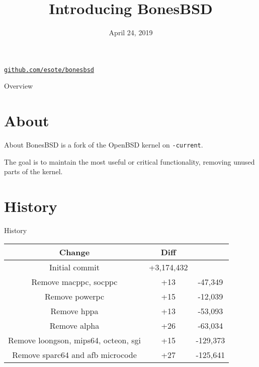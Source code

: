\documentclass{beamer}
\title[BonesBSD\hspace{1em}\texttt{\href{https://github.com/esote/bonesbsd}{github.com/esote/bonesbsd}}]{Introducing BonesBSD}
\date{April 24, 2019}
\begin{document}
\begin{frame}
	\titlepage
	\centering
	\texttt{\href{https://github.com/esote/bonesbsd}{github.com/esote/bonesbsd}}
\end{frame}

\begin{frame}{Overview}
	\tableofcontents
\end{frame}

\section{About}

\setlength{\parskip}{3em}

\begin{frame}{About}
	BonesBSD is a fork of the OpenBSD kernel on \texttt{-current}.

	The goal is to maintain the most useful or critical functionality,
	removing unused parts of the kernel.
\end{frame}

\section{History}

\begin{frame}{History}
	\begin{table}
		\begin{tabular}{|c|c c|}
			\hline
			Change & Diff & \\
			\hline
			Initial commit & +3,174,432 & \\
			Remove macppc, socppc & +13 & -47,349 \\
			Remove powerpc & +15 & -12,039 \\
			Remove hppa & +13 & -53,093 \\
			Remove alpha & +26 & -63,034 \\
			Remove loongson, mips64, octeon, sgi & +15 & -129,373 \\
			Remove sparc64 and afb microcode & +27 & -125,641 \\
			\hline
		\end{tabular}
	\end{table}
\end{frame}
\end{document}
